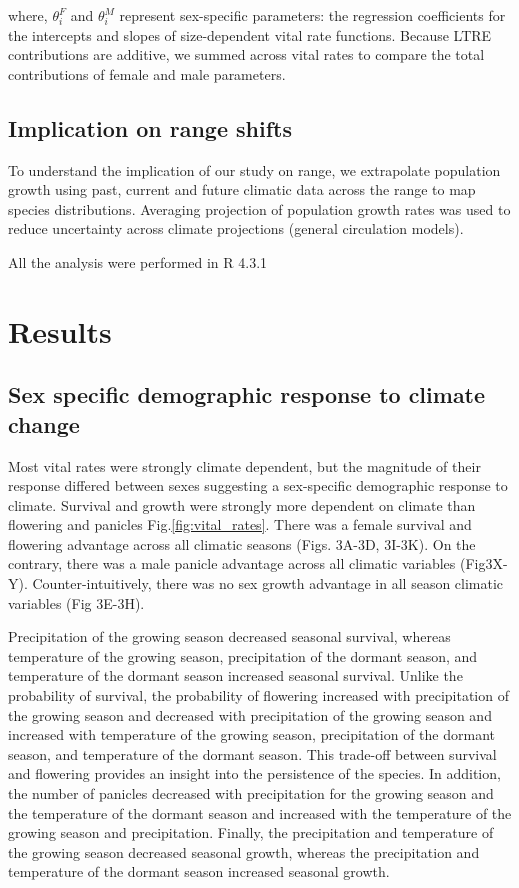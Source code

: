 \documentclass[11pt]{article}
\begin{document}
\noindent where, $\theta^{F}_{i}$ and $\theta^{M}_{i}$ represent sex-specific parameters: the regression coefficients for the intercepts and slopes of size-dependent vital rate functions. 
Because LTRE contributions are additive, we summed across vital rates to compare the total contributions of female and male parameters. 

\subsection*{Implication on range shifts}
To understand the implication of our study on range, we extrapolate population growth using past, current and future climatic data  across the range to map species distributions. 
Averaging projection of population growth rates was used to reduce uncertainty across climate projections (general circulation models). 

All the analysis were performed in R 4.3.1 \citep{RCoreteam}

\section*{Results}
\subsection*{Sex specific demographic response to climate change}
Most vital rates were strongly climate dependent, but the magnitude of their response differed between sexes suggesting a sex-specific demographic response to climate. 
Survival and growth were strongly more dependent on climate than flowering and panicles Fig.\ref{fig:vital_rates}.
There was a female survival and flowering advantage across all climatic seasons (Figs. 3A-3D, 3I-3K). 
On the contrary, there was a male panicle advantage across all climatic variables (Fig3X-Y). 
Counter-intuitively, there was no sex growth advantage in all season climatic variables (Fig 3E-3H). 

Precipitation of the growing season decreased seasonal survival, whereas temperature of the growing season, precipitation of the dormant season, and temperature of the dormant season increased seasonal survival.
Unlike the probability of survival, the probability of flowering increased with precipitation of the growing season and decreased with precipitation of the growing season and increased with temperature of the growing season, precipitation of the dormant season, and temperature of the dormant season.
This trade-off between survival and flowering provides an insight into the persistence of the species. 
In addition, the number of panicles decreased with precipitation for the growing season and the temperature of the dormant season and increased with the temperature of the growing season and precipitation.
Finally, the precipitation and temperature of the growing season decreased seasonal growth, whereas the precipitation and temperature of the dormant season increased seasonal growth. 
\end{document}
